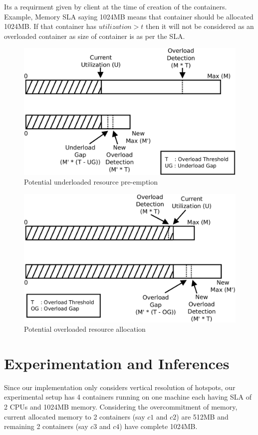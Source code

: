 \documentclass[a4paper, 11pt]{article}
\begin{document}
\noindent Its a requirment given by client at the time of creation of the containers. Example, Memory SLA saying 1024MB means that container should be allocated 1024MB. If that container has $utilization > t$ then it will not be considered as an overloaded container as size of container is as per the SLA.

\begin{figure}[!htb]
  \centering
  \includegraphics[scale=0.5]{underload}
  \caption{Potential underloaded resource pre-emption}
  \label{fig:underload}
\end{figure}

\begin{figure}[!htb]
  \centering
  \includegraphics[scale=0.5]{overload}
  \caption{Potential overloaded resource allocation}
  \label{fig:overload}
\end{figure}

\section{Experimentation and Inferences}
Since our implementation only considers vertical resolution of hotspots, our experimental setup has 4 containers running on one machine each having SLA of 2 CPUs and 1024MB memory. Considering the overcommitment of memory, current allocated memory to 2 containers (say $c1$ and $c2$) are 512MB and remaining 2 containers (say $c3$ and $c4$) have complete 1024MB.
\end{document}
